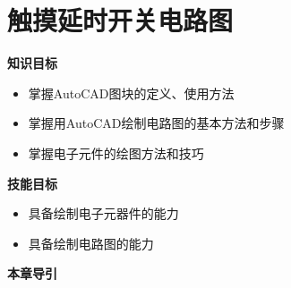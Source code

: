 \chapter{触摸延时开关电路图}
{\bfseries 知识目标}
\begin{itemize}
\item 掌握AutoCAD图块的定义、使用方法
\item 掌握用AutoCAD绘制电路图的基本方法和步骤
\item 掌握电子元件的绘图方法和技巧
\end{itemize}
{\bfseries 技能目标}
\begin{itemize}
\item 具备绘制电子元器件的能力
\item 具备绘制电路图的能力
\end{itemize}
{\bfseries 本章导引}


\endinput
